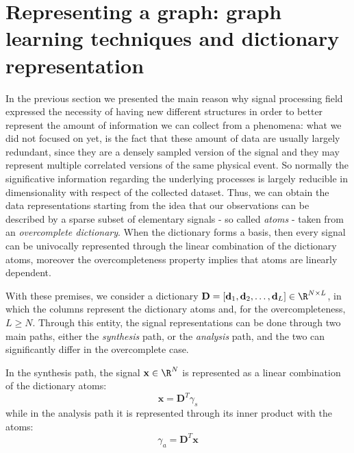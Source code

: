 \section{Representing a graph: graph learning techniques and dictionary representation}
In the previous section we presented the main reason why signal processing field expressed the necessity of having new different structures in order to better represent the amount of information we can collect from a phenomena: what we did not focused on yet, is the fact that these amount of data are usually largely redundant, since they are a densely sampled version of the signal and they may represent multiple correlated versions of the same physical event. So normally the significative information regarding the underlying processes is largely reducible in dimensionality with respect of the collected dataset. \cite{Tosic2011} Thus, we can obtain the data representations starting from the idea that our observations can be described by a sparse subset of elementary signals - so called \textit{atoms} - taken from an \textit{overcomplete dictionary}. When the dictionary forms a basis, then every signal can be univocally represented through the linear combination of the dictionary atoms, moreover the overcompleteness property  implies that atoms are linearly dependent. \cite{Tosic2011} \cite{Rubinstein2010}

With these premises, we consider a dictionary $\textbf{D} = [\textbf{d}_1, \textbf{d}_2, \dots, \textbf{d}_L] \in \R^{N \times L}$, in which the columns represent the dictionary atoms and, for the overcompleteness, $L\geq N$. Through this entity, the signal representations can be done through two main paths, either the \textit{synthesis} path, or the \textit{analysis} path, and the two can significantly differ in the overcomplete case.

In the synthesis path, the signal $\textbf{x} \in \R^N$ is represented as a linear combination of the dictionary atoms:
\begin{equation}
\textbf{x} = \textbf{D}^T \gamma_s
\label{eq:synthesis}
\end{equation}
while in the analysis path it is represented through its inner product with the atoms:
\begin{equation}
\gamma_a = \textbf{D}^T \textbf{x}
\label{eq:analysis}
\end{equation}

